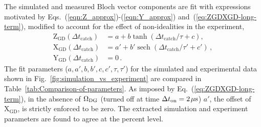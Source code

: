 The simulated and measured Bloch vector components are fit with expressions
motivated by Eqs.~(\ref{eqn:Z_approx})-(\ref{eqn:Y_approx}) and~(\ref{eq:ZGDXGD-long-term}),
modified to account for the effect of non-idealities in the experiment,
\begin{align}
\mathrm{Z}_{\text{GD}}(\Delta t_{\operatorname{catch}}) & =\ensuremath{a+b\tanh(\Delta t_{\operatorname{catch}}/\tau+c)},\\
\ensuremath{\mathrm{X}_{\text{GD}}(\Delta t_{\operatorname{catch}})} & =a'+b'\operatorname{sech}(\Delta t_{\operatorname{catch}}/\tau'+c')\,,\\
\mathrm{Y}_{\text{GD}}(\Delta t_{\operatorname{catch}}) & =0\,.
\end{align}
The fit parameters ($a,a',b,b',c,c',\tau,\tau'$) for the simulated
and experimental data shown in Fig.~\ref{fig:simulation_vs_experiment}
are compared in Table~\ref{tab:Comparison-of-parameters}. As imposed
by Eq.~(\ref{eq:ZGDXGD-long-term}), in the absence of $\Omega_{{\rm DG}}$
(turned off at time $\Delta t_{{\rm on}}=2\mkern2mu \mu{\rm s}$)
$a'$, the offset of $\mathrm{X}_{\text{GD}}$, is strictly enforced
to be zero. The extracted simulation and experiment parameters are
found to agree at the percent level.

